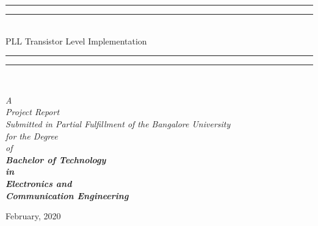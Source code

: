 \begin{titlepage}
  \centering %
	\vspace*{\baselineskip} %
	
	\rule{\textwidth}{1.6pt}\vspace*{-\baselineskip}\vspace*{2pt} %
	\rule{\textwidth}{0.4pt}\\[\baselineskip] %
	{\LARGE PLL Transistor Level Implementation} \\
	
	\rule{\textwidth}{0.4pt}\vspace*{-\baselineskip}\vspace{3.2pt} %
	\rule{\textwidth}{1.6pt}\\[\baselineskip] %
	
	\scshape %
	
	\vspace*{1\baselineskip} %
  \vspace{1 in}
  \begin{center}
    {\large{\textsl{
				{A \\ 
					  Project Report \\ %
					Submitted in Partial Fulfillment of the Bangalore University\\
					for the Degree \\ 
					of\\
					\large \bf Bachelor of Technology \\
                    in\\
                    \large \bf Electronics and \\
                    \large \bf Communication Engineering 
	  }}}}\\
    \vspace{50mm}

    
    
    
    \vspace{40mm}
    February, 2020\\

  \end{center}
\end{titlepage}
